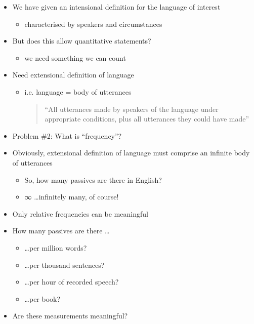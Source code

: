 \documentclass[a4paper,landscape,headrule,footrule,dvips]{foils}
\begin{document}
\begin{CJK}{UTF8}{min}
\begin{itemize}
\item We have given an intensional definition for
the language of interest
\begin{itemize}
\item characterised by speakers and circumstances
\end{itemize}
\item But does this allow quantitative statements?
\begin{itemize}
\item we need something we can count
\end{itemize}
\item Need extensional definition of language
\begin{itemize}
\item i.e. language = body of utterances
  \begin{quote}
“All utterances made by speakers of the
language under appropriate conditions,
plus all utterances they could have made”
\end{quote}
\end{itemize}
\end{itemize}
\begin{itemize}
\item Problem \#2: What is “frequency”?
\item Obviously, extensional definition of language
must comprise an infinite body of utterances
\begin{itemize}
\item So, how many passives are there in English?
\item ∞ \ldots infinitely many, of course!
\end{itemize}
\item Only relative frequencies can be meaningful
\end{itemize}

\begin{itemize}
\item How many passives are there …
\begin{itemize}
\item \ldots per million words?
\item \ldots per thousand sentences?
\item \ldots per hour of recorded speech?
\item \ldots per book?
\end{itemize}
\item Are these measurements meaningful?
\end{itemize}


\end{CJK}
\end{document}
